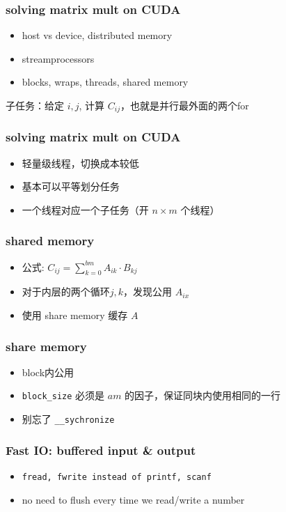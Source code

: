 
\begin{frame}
    \frametitle{solving matrix mult on CUDA}

    \begin{itemize}
        \item host vs device, distributed memory
        \item streamprocessors
        \item blocks, wraps, threads, shared memory
    \end{itemize}

    子任务：给定 $i,j$, 计算 $C_{ij}$，也就是并行最外面的两个for
\end{frame}

\begin{frame}
    \frametitle{solving matrix mult on CUDA}

    \begin{itemize}
        \item 轻量级线程，切换成本较低
        \item 基本可以平等划分任务
        \item 一个线程对应一个子任务（开 $n \times m$ 个线程）
    \end{itemize}
\end{frame}

\begin{frame}
    \frametitle{shared memory}
    \begin{itemize}
        \item 公式: $C_{ij} = \sum\limits_{k=0}^{bm} A_{ik} \cdot B_{kj}$
        \item 对于内层的两个循环$j,k$，发现公用 $A_{ix}$
        \item 使用 share memory 缓存 $A$
    \end{itemize}
\end{frame}

\begin{frame}
    \frametitle{share memory}
    \begin{itemize}
        \item block内公用
        \item \texttt{block\_size} 必须是 $am$ 的因子，保证同块内使用相同的一行
        \item 别忘了 \texttt{\_\_sychronize}
    \end{itemize}
\end{frame}

\begin{frame}
    \frametitle{Fast IO: buffered input \& output}
    \begin{itemize}
        \item \texttt{fread, fwrite instead of printf, scanf}
        \item no need to flush every time we read/write a number
    \end{itemize}
\end{frame}


